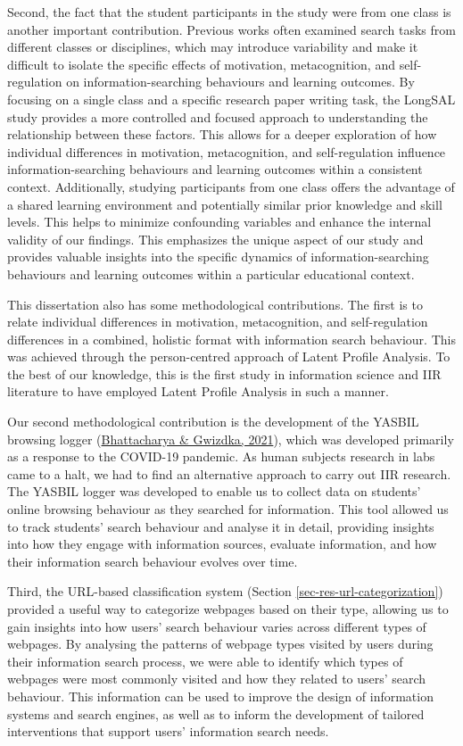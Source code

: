 \documentclass[letterpaper, nobind]{templates/ociamthesis}
\begin{document}
Second, the fact that the student participants in the study were from one class is another important contribution. Previous works often examined search tasks from different classes or disciplines, which may introduce variability and make it difficult to isolate the specific effects of motivation, metacognition, and self-regulation on information-searching behaviours and learning outcomes.
By focusing on a single class and a specific research paper writing task, the LongSAL study provides a more controlled and focused approach to understanding the relationship between these factors.
This allows for a deeper exploration of how individual differences in motivation, metacognition, and self-regulation influence information-searching behaviours and learning outcomes within a consistent context.
Additionally, studying participants from one class offers the advantage of a shared learning environment and potentially similar prior knowledge and skill levels. This helps to minimize confounding variables and enhance the internal validity of our findings.
This emphasizes the unique aspect of our study and provides valuable insights into the specific dynamics of information-searching behaviours and learning outcomes within a particular educational context.

This dissertation also has some methodological contributions.
The first is to relate individual differences in motivation, metacognition, and self-regulation differences in a combined, holistic format with information search behaviour.
This was achieved through the person-centred approach of Latent Profile Analysis.
To the best of our knowledge, this is the first study in information science and IIR literature to have employed Latent Profile Analysis in such a manner.

Our second methodological contribution is the development of the YASBIL browsing logger (\protect\hyperlink{ref-bhattacharya2021yasbil}{Bhattacharya \& Gwizdka, 2021}), which was developed primarily as a response to the COVID-19 pandemic.
As human subjects research in labs came to a halt, we had to find an alternative approach to carry out IIR research.
The YASBIL logger was developed to enable us to collect data on students' online browsing behaviour as they searched for information. This tool allowed us to track students' search behaviour and analyse it in detail, providing insights into how they engage with information sources, evaluate information, and how their information search behaviour evolves over time.

Third, the URL-based classification system (Section \ref{sec-res-url-categorization}) provided a useful way to categorize webpages based on their type, allowing us to gain insights into how users' search behaviour varies across different types of webpages. By analysing the patterns of webpage types visited by users during their information search process, we were able to identify which types of webpages were most commonly visited and how they related to users' search behaviour. This information can be used to improve the design of information systems and search engines, as well as to inform the development of tailored interventions that support users' information search needs.
\end{document}
